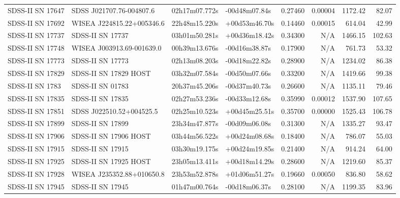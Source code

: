 \begin{longtable}{llllrrrr}
SDSS-II SN 17647 &        SDSS J021707.76-004807.6 &   02h17m07.772s &   -00d48m07.84s &  0.27460 &  0.00004 &  1172.42 &       82.07 \\
SDSS-II SN 17692 &       WISEA J224815.22+005346.6 &   22h48m15.220s &   +00d53m46.70s &  0.14460 &  0.00015 &   614.04 &       42.99 \\
SDSS-II SN 17737 &                SDSS-II SN 17737 &   03h01m50.281s &   +00d36m18.42s &  0.34300 &      N/A &  1466.15 &      102.63 \\
SDSS-II SN 17748 &       WISEA J003913.69-001639.0 &   00h39m13.676s &   -00d16m38.87s &  0.17900 &      N/A &   761.73 &       53.32 \\
SDSS-II SN 17773 &                SDSS-II SN 17773 &   02h13m08.203s &   -00d18m22.82s &  0.28900 &      N/A &  1234.02 &       86.38 \\
SDSS-II SN 17829 &           SDSS-II SN 17829 HOST &   03h32m07.584s &   -00d50m07.66s &  0.33200 &      N/A &  1419.66 &       99.38 \\
SDSS-II SN 1783  &                SDSS-II SN 01783 &   20h37m45.206s &   -00d37m40.73s &  0.26600 &      N/A &  1135.11 &       79.46 \\
SDSS-II SN 17835 &                SDSS-II SN 17835 &   02h27m53.236s &   -00d33m12.68s &  0.35990 &  0.00012 &  1537.90 &      107.65 \\
SDSS-II SN 17851 &        SDSS J022510.52+004525.5 &   02h25m10.523s &   +00d45m25.51s &  0.35700 &  0.00000 &  1525.43 &      106.78 \\
SDSS-II SN 17899 &                SDSS-II SN 17899 &   23h34m47.877s &   -00d09m06.08s &  0.31300 &      N/A &  1335.27 &       93.47 \\
SDSS-II SN 17906 &           SDSS-II SN 17906 HOST &   03h44m56.522s &   +00d24m08.68s &  0.18400 &      N/A &   786.07 &       55.03 \\
SDSS-II SN 17915 &                SDSS-II SN 17915 &   03h30m19.175s &   +00d24m19.85s &  0.21400 &      N/A &   914.24 &       64.00 \\
SDSS-II SN 17925 &           SDSS-II SN 17925 HOST &   23h05m13.411s &   +00d18m14.29s &  0.28600 &      N/A &  1219.60 &       85.37 \\
SDSS-II SN 17928 &       WISEA J235352.88+010650.8 &   23h53m52.878s &   +01d06m51.27s &  0.19660 &  0.00050 &   836.80 &       58.62 \\
SDSS-II SN 17945 &                SDSS-II SN 17945 &   01h47m00.764s &   -00d18m06.37s &  0.28100 &      N/A &  1199.35 &       83.96 \\

\end{longtable}
